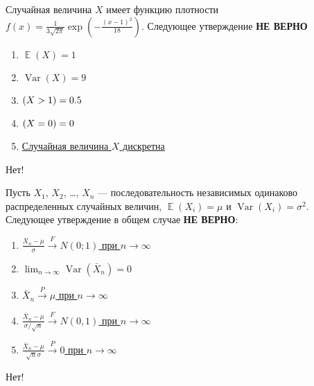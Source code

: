 \documentclass[t]{beamer}
\DeclareMathOperator{\Var}{Var}
\DeclareMathOperator{\E}{\mathbb{E}}
\let\P\relax
\DeclareMathOperator{\P}{\mathbb{P}}
\begin{document}
 \begin{frame} \label{29-No} 
\begin{block}{29} 

Случайная величина $X$ имеет функцию плотности $f(x)=\frac{1}{3\sqrt{2\pi}} \exp\left(-\frac{(x-1)^2}{18} \right)$. Следующее утверждение \textbf{НЕ ВЕРНО}
 


 \end{block} 
\begin{enumerate} 
\item[] \hyperlink{29-No}{\beamergotobutton{} $\E(X)=1$}
\item[] \hyperlink{29-No}{\beamergotobutton{} $\Var(X)=9$}
\item[] \hyperlink{29-No}{\beamergotobutton{} $\P(X>1)=0.5$}
\item[] \hyperlink{29-No}{\beamergotobutton{} $\P(X=0)=0$}
\item[] \hyperlink{29-Yes}{\beamergotobutton{} Случайная величина $X$ дискретна}
\end{enumerate} 

 \alert{Нет!} 
\end{frame} 


 \begin{frame} \label{30-No} 
\begin{block}{30} 

Пусть $X_1$, $X_2$, \ldots, $X_n$ — последовательность независимых одинаково распределенных случайных величин, $\E(X_i)=\mu$ и $\Var(X_i)=\sigma^2$. Следующее утверждение в общем случае \textbf{НЕ ВЕРНО}:
 


 \end{block} 
\begin{enumerate} 
\item[] \hyperlink{30-Yes}{\beamergotobutton{} $\frac{X_n-\mu}{\sigma} \overset{F}{\to} N(0;1)$ при $n\to\infty$}
\item[] \hyperlink{30-No}{\beamergotobutton{} $\lim_{n\to\infty} \Var(\bar{X}_n)=0$}
\item[] \hyperlink{30-No}{\beamergotobutton{} $\bar{X}_n \overset{P}{\to} \mu$ при $n\to\infty$}
\item[] \hyperlink{30-No}{\beamergotobutton{}$\frac{\bar{X}_n-\mu}{\sigma /\sqrt{n}} \overset{F}{\to } N(0,1) $ при $n\to\infty$}
\item[] \hyperlink{30-No}{\beamergotobutton{} $\frac{\bar{X}_n-\mu}{\sqrt{n} \sigma } \overset{P}{\to } 0 $ при $n\to\infty$}
\end{enumerate} 

 \alert{Нет!} 
\end{frame} 
\end{document}
